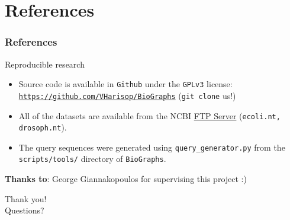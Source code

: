 \documentclass[9pt]{beamer}
\begin{document}
\section{References}
\begin{frame}[allowframebreaks]
	\frametitle{References}
	\nocite{papadakis2015graph}
	\nocite{rajaraman2012mining}
	
\end{frame}

\begin{frame}{Reproducible research}
	\begin{itemize}
	\item Source code is available in \texttt{Github} under the \texttt{GPLv3} license: \href{https://github.com/VHarisop/BioGraphs}{\texttt{https://github.com/VHarisop/BioGraphs}} (\texttt{git clone} us!)
	\item All of the datasets are available from the NCBI \href{ftp://ftp.ncbi.nlm.nih.gov/blast/db/}{FTP Server} (\texttt{ecoli.nt, drosoph.nt}).
	\item The query sequences were generated using \texttt{query\_generator.py} from the \texttt{scripts/tools/} directory of \texttt{BioGraphs}.
	\end{itemize}
\bigskip\textbf{Thanks to}: George Giannakopoulos for supervising this project :) 
\end{frame}

\begin{frame}
	\centering
	\Huge Thank you! \\Questions?
\end{frame}
\end{document}
